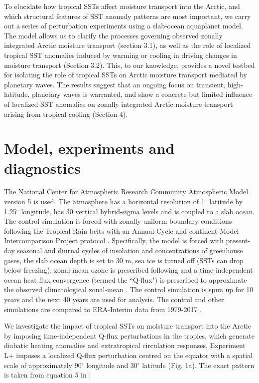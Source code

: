 \documentclass[draft]{agujournal2019}
\newcommand{\cledit}[1]{{\textcolor{violet}{#1}}}
\begin{document}
To elucidate how tropical SSTs affect moisture transport into the Arctic, and which structural features of SST anomaly patterns are most important, we carry out a series of perturbation experiments using a slab-ocean aquaplanet model. The model allows us to clarify the processes governing observed zonally integrated Arctic moisture transport (section 3.1), as well as the role of localized tropical SST anomalies induced by warming or cooling in driving changes in moisture transport (Section 3.2). This, to our knowledge, provides a novel testbed for isolating the role of tropical SSTs on Arctic moisture transport mediated by planetary waves. The results suggest that an ongoing focus on transient, high-latitude, planetary waves is warranted, and show a concrete but limited influence of localized SST anomalies on zonally integrated Arctic moisture transport arising from tropical cooling (Section 4).




\section{Model, experiments and diagnostics}

The National Center for Atmospheric Research Community Atmospheric Model version 5 \cite<NCAR CAM5,>{Neale2010} is used. The atmosphere has a horizontal resolution of 1$^{\circ}$ latitude by 1.25$^{\circ}$ longitude, has 30 vertical hybrid-sigma levels and is coupled to a slab ocean. The control simulation is forced with zonally uniform boundary conditions following the Tropical Rain belts with an Annual Cycle and continent Model Intercomparison Project protocol \cite<TRACMIP,>{Voigt2016}. Specifically, the model is forced with present-day seasonal and diurnal cycles of insolation and concentrations of greenhouse gases, the slab ocean depth is set to 30 m, sea ice is turned off (SSTs can drop below freezing), zonal-mean ozone is prescribed following \citeA{BlackburnHoskins2013}\cledit{,} and a time-independent ocean heat flux convergence (termed the ``Q-flux") is prescribed to approximate the observed climatological zonal-mean \cite<equation 3 and Table 2 in>{Voigt2016}. The control simulation is spun up for 10 years and the next 40 years are used for analysis. The control and other simulations are compared to ERA-Interim data from 1979-2017 \cite{Dee2011}.


We investigate the impact of tropical SSTs on moisture transport into the Arctic by imposing time-independent Q-flux perturbations in the tropics, which generate diabatic heating anomalies and extratropical circulation responses. Experiment L+ imposes a localized Q-flux perturbation centred on the equator with a spatial scale of approximately 90$^\circ$ longitude and 30$^\circ$ latitude (Fig. 1a). The exact pattern is taken from equation 5 in :
\end{document}
